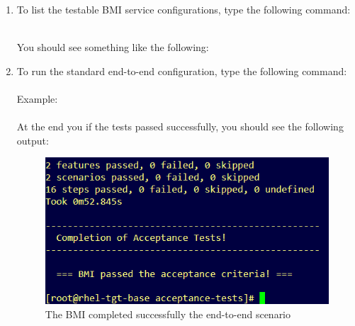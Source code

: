 \begin{enumerate}

\item  To list the testable BMI service configurations, type the following command: \\

 \\

\pagebreak

You should see something like the following:


\item To run the standard end-to-end configuration, type the following command: \\

 \\

  Example: \\

 \\


At the end you if the tests passed successfully, you should see the following output: \\

\begin{figure}[!h] 
\begin{center}
\includegraphics[scale=0.7]{figures/bdd-bmi-passed-tests.png}
\end{center}
\caption{The BMI completed successfully the end-to-end scenario}
\label{fig:bdd-bmi-example-successful}
\end{figure}


\end{enumerate}
